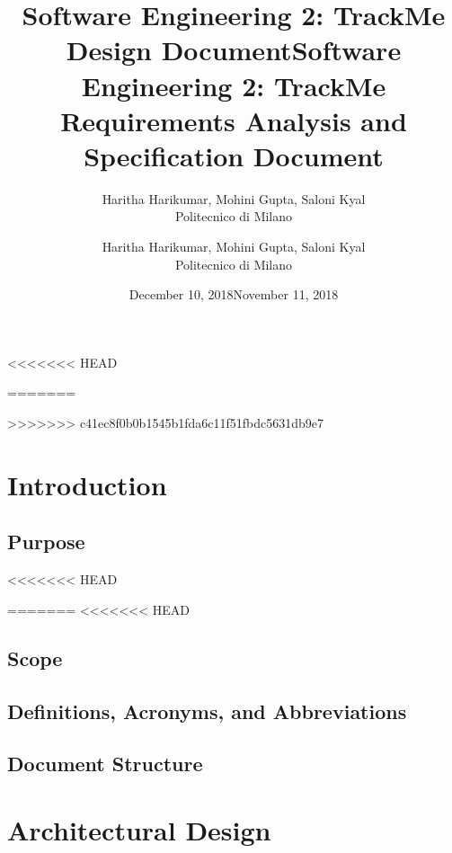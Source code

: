 \documentclass[12pt, a4paper]{report}
\begin{document}
<<<<<<< HEAD
\title{Software Engineering 2: TrackMe \\ \vspace{1em} Design Document}
\author{Haritha Harikumar, Mohini Gupta, Saloni Kyal\\
Politecnico di Milano}
\date{December 10, 2018}
=======
\title{Software Engineering 2: TrackMe \\ \vspace{1em} Requirements Analysis and Specification Document}
\author{Haritha Harikumar, Mohini Gupta, Saloni Kyal\\
Politecnico di Milano}
\date{November 11, 2018}
>>>>>>> c41ec8f0b0b1545b1fda6c11f51fbdc5631db9e7
\maketitle
\tableofcontents

\chapter{Introduction}
\label{ch:introduction}

\section{Purpose}
<<<<<<< HEAD

=======
<<<<<<< HEAD


\section{Scope}


\section{Definitions, Acronyms, and Abbreviations}


\section{Document Structure}


\chapter{Architectural Design}
\label{ch:architectural_design}
\end{document}

